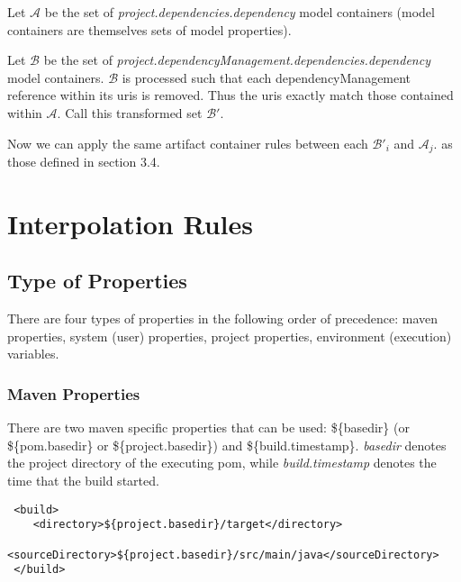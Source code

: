 \documentclass[12pt]{amsart}
\begin{document}
Let \begin{math}\mathcal{A}\end{math} be the set of \emph{project.dependencies.dependency} model containers (model containers are themselves sets of model properties). 

Let \begin{math}\mathcal{B}\end{math} be the set of 
\emph{project.dependencyManagement.dependencies.dependency }model containers. \begin{math}\mathcal{B}\end{math} is processed such that each dependencyManagement reference within its uris is removed. Thus the uris exactly match those contained within \begin{math}\mathcal{A}\end{math}. Call this transformed set \begin{math} \mathcal{B'}\end{math}. 

Now we can apply the same artifact container rules between each  \begin{math} \mathcal{B'}_{i} \end{math} and  \begin{math} \mathcal{A}_{j}\end{math}.  as those defined in section 3.4.

\section{Interpolation Rules}
\subsection{Type of Properties}
There are four types of properties in the following order of precedence: maven properties, system (user) properties, project properties, environment (execution) variables. 

\subsubsection{Maven Properties}
There are two maven specific properties that can be used: \$\{basedir\} (or \$\{pom.basedir\} or \$\{project.basedir\}) and \$\{build.timestamp\}. \emph{basedir} denotes the project directory of the executing pom, while\emph{ build.timestamp} denotes the time that the build started.

\begin{verbatim}
 <build>
    <directory>${project.basedir}/target</directory>
    <sourceDirectory>${project.basedir}/src/main/java</sourceDirectory>
 </build>
\end{verbatim}
\end{document}
